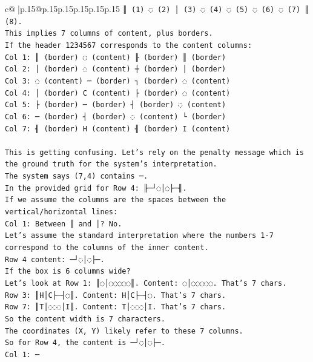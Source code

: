 \documentclass{article}
\begin{document}
{\begin{supertabular}{c@{$\;$}|p{.15\linewidth}@{}p{.15\linewidth}p{.15\linewidth}p{.15\linewidth}p{.15\linewidth}p{.15\linewidth}}
{{{\texttt{║ (1) ◌ (2) │ (3) ◌ (4) ◌ (5) ◌ (6) ◌ (7) ║ (8).} \\
\texttt{This implies 7 columns of content, plus borders.} \\
\texttt{If the header 1234567 corresponds to the content columns:} \\
\texttt{Col 1: ║ (border) ◌ (content) ╟ (border) ║ (border)} \\
\texttt{Col 2: │ (border) ◌ (content) ┼ (border) │ (border)} \\
\texttt{Col 3: ◌ (content) ─ (border) ┐ (border) ◌ (content)} \\
\texttt{Col 4: │ (border) C (content) ├ (border) ◌ (content)} \\
\texttt{Col 5: ├ (border) ─ (border) ┤ (border) ◌ (content)} \\
\texttt{Col 6: ─ (border) ┤ (border) ◌ (content) └ (border)} \\
\texttt{Col 7: ╢ (border) H (content) ╢ (border) I (content)} \\
\\ 
\texttt{This is getting confusing. Let's rely on the penalty message which is the ground truth for the system's interpretation.} \\
\texttt{The system says (7,4) contains ─.} \\
\texttt{In the provided grid for Row 4: ╟─┘◌│◌├─╢.} \\
\texttt{If we assume the columns are the spaces between the vertical/horizontal lines:} \\
\texttt{Col 1: Between ║ and │? No.} \\
\texttt{Let's assume the standard interpretation where the numbers 1{-}7 correspond to the columns of the inner content.} \\
\texttt{Row 4 content: ─┘◌│◌├─.} \\
\texttt{If the box is 6 columns wide?} \\
\texttt{Let's look at Row 1: ║◌│◌◌◌◌◌║. Content: ◌│◌◌◌◌◌. That's 7 chars.} \\
\texttt{Row 3: ║H│C├─┤◌║. Content: H│C├─┤◌. That's 7 chars.} \\
\texttt{Row 7: ║T│◌◌◌│I║. Content: T│◌◌◌│I. That's 7 chars.} \\
\texttt{So the content width is 7 characters.} \\
\texttt{The coordinates (X, Y) likely refer to these 7 columns.} \\
\texttt{So for Row 4, the content is ─┘◌│◌├─.} \\
\texttt{Col 1: ─} \\
}}}
\end{supertabular}}
\end{document}
